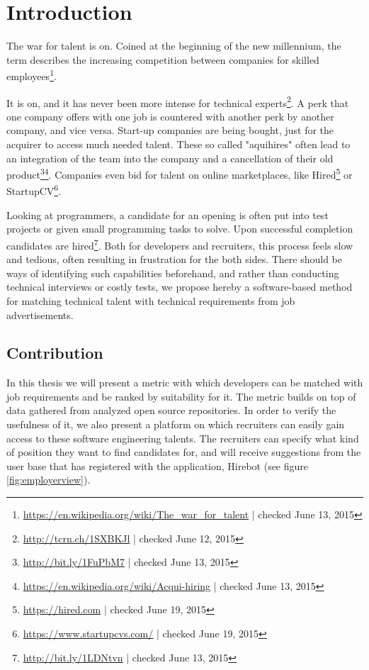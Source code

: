 \chapter{Introduction}\label{ch:introduction}
The war for talent is on. Coined at the beginning of the new millennium, the term describes the increasing competition between companies for skilled employees\footnote{\url{https://en.wikipedia.org/wiki/The_war_for_talent} | checked June 13, 2015}.

It is on, and it has never been more intense for technical experts\footnote{\url{http://tcrn.ch/1SXBKJl} | checked June 12, 2015}. A perk that one company offers with one job is countered with another perk by another company, and vice versa. Start-up companies are being bought, just for the acquirer to access much needed talent. These so called "aquihires" often lead to an integration of the team into the company and a cancellation of their old product\footnote{\url{http://bit.ly/1FuPbM7} | checked June 13, 2015}\footnote{\url{https://en.wikipedia.org/wiki/Acqui-hiring} | checked June 13, 2015}. Companies even bid for talent on online marketplaces, like Hired\footnote{\url{https://hired.com} | checked June 19, 2015} or StartupCV\footnote{\url{https://www.startupcvs.com/} | checked June 19, 2015}.


Looking at programmers, a candidate for an opening is often put into test projects or given small programming tasks to solve. Upon successful completion candidates are hired\footnote{\url{http://bit.ly/1LDNtvn} | checked June 13, 2015}. Both for developers and recruiters, this process feels slow and tedious, often resulting in frustration for the both sides. There should be ways of identifying such capabilities beforehand, and rather than conducting technical interviews or costly tests, we propose hereby a software-based method for matching technical talent with technical requirements from job advertisements.

\section{Contribution}
In this thesis we will present a metric with which developers can be matched with job requirements and be ranked by suitability for it. The metric builds on top of data gathered from analyzed open source repositories. In order to verify the usefulness of it, we also present a platform on which recruiters can easily gain access to these software engineering talents. The recruiters can specify what kind of position they want to find candidates for, and will receive suggestions from the user base that has registered with the application, Hirebot (see figure \ref{fig:employerview}).

